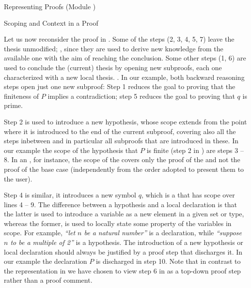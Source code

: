 \begin{omgroup}[id=proofs,short=Representing Proofs]{Representing Proofs (Module {})}
\begin{module}[id=scoping-proofs]
\begin{omgroup}[id=proofs.scoping]{Scoping and Context in a Proof}
\begin{omtext}
  Let us now reconsider the proof in {}. Some of the steps (2,
  3, 4, 5, 7) leave the thesis unmodified; , since they are used
  to derive new knowledge from the available one with the aim of reaching the conclusion.
  Some other steps (1, 6) are used to conclude the (current) thesis by opening new
  subproofs, each one characterized with a new local thesis.  .  In our example, both backward reasoning steps open just
  one new subproof: Step 1 reduces the goal to proving that the finiteness of $P$ implies
  a contradiction; step 5 reduces the goal to proving that $q$ is prime.
\end{omtext}

Step 2 is used to introduce a new hypothesis, whose scope extends from the point where it
is introduced to the end of the current subproof, covering also all the steps inbetween
and in particular all subproofs that are introduced in these. In our example the scope of
the hypothesis that $P$ is finite (step 2 in {}) are steps 3 --
8. In an {}, for instance, the scope of the
{} covers only the proof of the {}
and not the proof of the base case (independently from the order adopted to present them
to the user).
  
Step 4 is similar, it introduces a new symbol $q$, which is a
{} that has scope over lines 4 -- 9.  The difference between a
hypothesis and a local declaration is that the latter is used to introduce a variable as a
new element in a given set or type, whereas the former, is used to locally state some
property of the variables in scope. For example, {\emph{``let $n$ be a natural number''}}
is a declaration, while {\emph{``suppose $n$ to be a multiple of 2''}} is a hypothesis.
The introduction of a new hypothesis or local declaration should always be justified by a
proof step that discharges it. In our example the declaration $P$ is discharged in step
10. Note that in contrast to the representation in {} we have
chosen to view step 6 in {} as a top-down proof step rather
than a proof comment.
  

\end{omgroup}
\end{module}
\end{omgroup}
